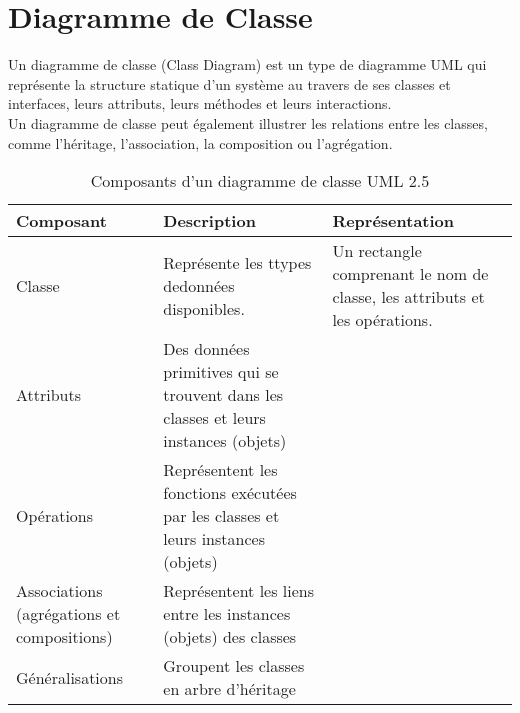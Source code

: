 \section{Diagramme de Classe}\label{sec:diagramme_classe}

\begin{definition}
Un diagramme de classe (Class Diagram) est un type de diagramme UML qui représente la structure statique d'un système au travers de ses classes et interfaces, leurs attributs, leurs méthodes et leurs interactions.\\
Un diagramme de classe peut également illustrer les relations entre les classes, comme l'héritage, l'association, la composition ou l'agrégation.
\end{definition}


\begin{table}[h]
\caption{Composants d'un diagramme de classe UML 2.5}
\label{tbl:diagram_class_components}
\begin{adjustbox}{max width=\textwidth}
\begin{tabular}{l|l|l}
\toprule
\textbf{Composant} & \textbf{Description} & \textbf{Représentation} \\
\midrule
Classe & Représente les ttypes dedonnées disponibles. & Un rectangle comprenant le nom de classe, les attributs et les opérations. \\
Attributs & Des données primitives qui se trouvent dans les classes et leurs
instances (objets) &  \\
Opérations & Représentent les fonctions exécutées par les classes et leurs instances (objets) &  \\
Associations (agrégations et compositions) & Représentent les liens entre les instances (objets) des classes & \\
Généralisations & Groupent les classes en arbre d’héritage & \\
\bottomrule
\end{tabular}
\end{adjustbox}
\end{table}





